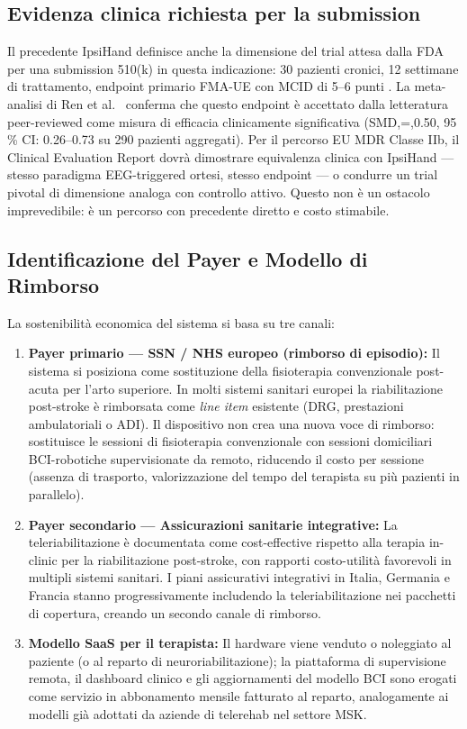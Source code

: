 \documentclass[a4paper,11pt]{article}
\begin{document}
\subsection{Evidenza clinica richiesta per la submission}
Il precedente IpsiHand definisce anche la dimensione del trial attesa dalla 
FDA per una submission 510(k) in questa indicazione: 30 pazienti cronici, 12 settimane di trattamento, endpoint primario 
FMA-UE con MCID di 5--6 punti \cite{rustamov2025ipsihand}. La meta-analisi di Ren et al.\ \cite{ren2024effect} conferma che 
questo endpoint è accettato dalla letteratura peer-reviewed come misura di efficacia clinicamente significativa 
(SMD,=,0.50, 95 \% CI: 0.26--0.73 su 290 pazienti aggregati). 
Per il percorso EU MDR Classe IIb, il Clinical Evaluation Report dovrà dimostrare equivalenza clinica con IpsiHand — 
stesso paradigma EEG-triggered ortesi, stesso endpoint — o condurre un trial pivotal di dimensione analoga con controllo attivo. 
Questo non è un ostacolo imprevedibile: è un percorso con precedente diretto e costo stimabile.


\subsection{Identificazione del Payer e Modello di Rimborso}
La sostenibilità economica del sistema si basa su tre canali:

\begin{enumerate}
    \item \textbf{Payer primario — SSN / NHS europeo (rimborso di episodio):}
    Il sistema si posiziona come sostituzione della fisioterapia
    convenzionale post-acuta per l'arto superiore. In molti sistemi sanitari
    europei la riabilitazione post-stroke è rimborsata come \textit{line item}
    esistente (DRG, prestazioni ambulatoriali o ADI). Il dispositivo non crea
    una nuova voce di rimborso: sostituisce le sessioni di fisioterapia
    convenzionale con sessioni domiciliari BCI-robotiche supervisionate
    da remoto, riducendo il costo per sessione (assenza di trasporto,
    valorizzazione del tempo del terapista su più pazienti in parallelo).

    \item \textbf{Payer secondario — Assicurazioni sanitarie integrative:}
    La teleriabilitazione è documentata come cost-effective rispetto alla
    terapia in-clinic per la riabilitazione post-stroke, con rapporti
    costo-utilità favorevoli in multipli sistemi sanitari. I piani assicurativi
    integrativi in Italia, Germania e Francia stanno progressivamente
    includendo la teleriabilitazione nei pacchetti di copertura, creando
    un secondo canale di rimborso.

    \item \textbf{Modello SaaS per il terapista:}
    Il hardware viene venduto o noleggiato al paziente (o al reparto di
    neuroriabilitazione); la piattaforma di supervisione remota, il
    dashboard clinico e gli aggiornamenti del modello BCI sono erogati come
    servizio in abbonamento mensile fatturato al reparto, analogamente ai
    modelli già adottati da aziende di telerehab nel settore MSK.
\end{enumerate}
\end{document}
